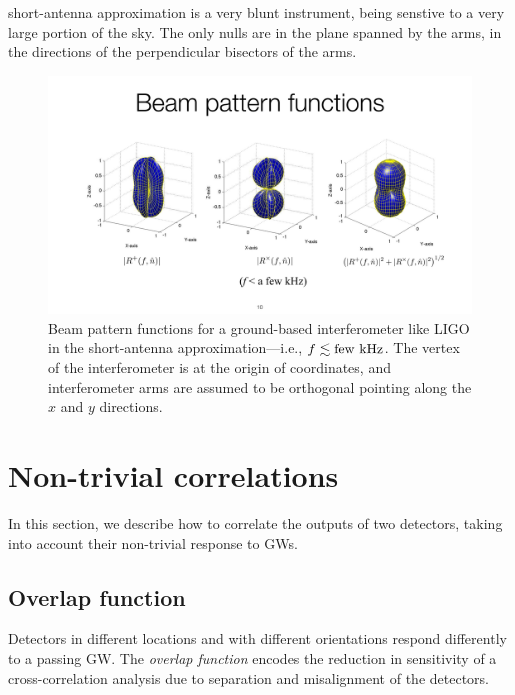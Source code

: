 short-antenna approximation is a very blunt instrument,
being senstive to a very large portion of the sky. 
The only nulls are in the plane spanned by the arms, 
in the directions of the perpendicular bisectors of 
the arms.
%
\begin{figure}[htbp!]
\begin{center}
\includegraphics[width=\textwidth]{Figures/LIGO_beam_patterns}
\caption{Beam pattern functions for a ground-based interferometer
like LIGO in the short-antenna approximation---i.e., $f\lesssim {\rm few\ kHz}$.
The vertex of the interferometer is at the origin of coordinates,
and interferometer arms are assumed to be orthogonal pointing along
the $x$ and $y$ directions.}
\label{f:LIGO_beam_patterns}
\end{center}
\end{figure}
%

\section{Non-trivial correlations}
\label{s:nontrivial_correlations}

In this section, we describe how to correlate the outputs
of two detectors, taking into account their non-trivial
response to GWs.

\subsection{Overlap function}

Detectors in different locations and with different 
orientations respond differently to a passing GW.
The {\em overlap function} encodes the reduction in 
sensitivity of a cross-correlation analysis due to 
separation and misalignment of the detectors.

